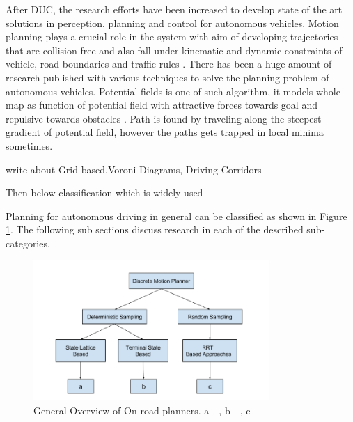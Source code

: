 After DUC, the research efforts have been increased to develop state of the art solutions in perception, planning and control for autonomous vehicles. Motion planning plays a crucial role in the system with aim of developing trajectories that are collision free and also fall under kinematic and dynamic constraints of vehicle, road boundaries and traffic rules \cite{motion_planning_techniques}. There has been a huge amount of research published with various techniques to solve the planning problem of autonomous vehicles. Potential fields is one of such algorithm, it models whole map as function of potential field with attractive forces towards goal and repulsive towards obstacles \cite{potential_field_3} \cite{potential_field_1} \cite{potential_field_2}. Path is found by traveling along the steepest gradient of potential field, however the paths gets trapped in local minima sometimes.  


write about
Grid based,Voroni Diagrams, Driving Corridors 

Then below classification which is widely used


 
 Planning for autonomous driving in general can be classified as shown in Figure \ref{related_work_classification}. The following sub sections discuss research in each of the described sub-categories. 

\begin{figure}[H]
	\centering
	\includegraphics[width=0.8\textwidth]{Images/related_work/planning_division.png}
	\caption{General Overview of On-road planners. a - \cite{cmu_parallel_thesis}  \cite{diss_shui_phd_thesis} \cite{traj_planner_optimization} \cite{lattice_Gu_Tiyanu} \cite{unit_A_star} , b - \cite{kolski_thesis} \cite{real_time_traj_plan_article} \cite{darpa_urban_challenge}, c -\cite{rrt_star} \cite{rrt_urban_driv} \cite{mit_rrt}
	}
	\label{related_work_classification}
\end{figure}

